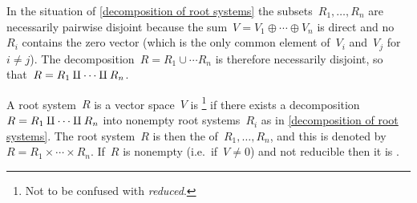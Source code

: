 \begin{remark}
  In the situation of \cref{decomposition of root systems} the subsets~$R_1, \dotsc, R_n$ are necessarily pairwise disjoint because the sum~$V = V_1 \oplus \dotsb \oplus V_n$ is direct and no~$R_i$ contains the zero vector (which is the only common element of~$V_i$ and~$V_j$ for~$i \neq j$).
  The decomposition~$R = R_1 \cup \dotsb R_n$ is therefore necessarily disjoint, so that~$R = R_1 \amalg \dotsb \amalg R_n$.
\end{remark}


\begin{definition}
  A root system~$R$ is a vector space~$V$ is %
  \footnote{Not to be confused with \emph{reduced}.}
  if there exists a decomposition~$R = R_1 \amalg \dotsb \amalg R_n$ into nonempty root systems~$R_i$ as in \cref{decomposition of root systems}.
  The root system~$R$ is then the  of~$R_1, \dotsc, R_n$, and this is denoted by~$R = R_1 \times \dotsb \times R_n$.
  If~$R$ is nonempty (i.e.\ if~$V \neq 0$) and not reducible then it is .
\end{definition}


%   
%   
%   


